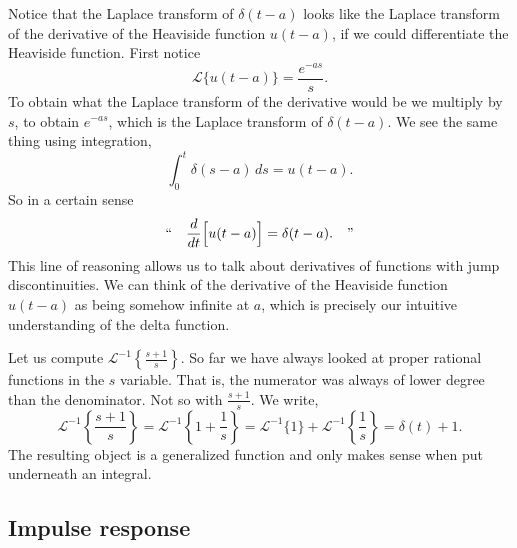 \documentclass{ximera}
\begin{document}
\begin{remark}
    Notice that the Laplace transform of $\delta(t-a)$ looks like the Laplace transform of the derivative of the Heaviside function $u(t-a)$, if we could differentiate the Heaviside function. First notice
    \begin{equation*}
        {\mathcal{L}} \bigl\{ u(t-a) \bigr\} = \frac{e^{-as}}{s}.
    \end{equation*}
    To obtain what the Laplace transform of the derivative would be we multiply by $s$, to obtain $e^{-as}$, which is the Laplace transform of $\delta(t-a)$. We see the same thing using integration,
    \begin{equation*}
        \int_0^t \delta(s-a)\,ds = u(t-a) .
    \end{equation*}
    So in a certain sense
    \begin{equation*}
        \text{``}
        \quad \frac{d}{dt} \Bigl[ u(t-a) \Bigr] = \delta(t-a) . \quad
        \text{''}
    \end{equation*}
    This line of reasoning allows us to talk about derivatives of functions with jump discontinuities. We can think of the derivative of the Heaviside function $u(t-a)$ as being somehow infinite at $a$, which is precisely our intuitive understanding of the delta function.
\end{remark}

\begin{example}
    Let us compute ${\mathcal{L}}^{-1} \left\{ \frac{s+1}{s} \right\}$.  So far we have always looked at proper rational functions in the $s$ variable. That is, the numerator was always of lower degree than the denominator. Not so with $\frac{s+1}{s}$. We write,
    \begin{equation*}
        {\mathcal{L}}^{-1} \left\{ \frac{s+1}{s} \right\} = {\mathcal{L}}^{-1} \left\{ 1 + \frac{1}{s} \right\} = {\mathcal{L}}^{-1} \{ 1 \} + {\mathcal{L}}^{-1} \left\{ \frac{1}{s} \right\} = \delta(t) + 1 .
    \end{equation*}
    The resulting object is a generalized function and only makes sense when put underneath an integral.
\end{example}

\subsection{Impulse response}
\end{document}
